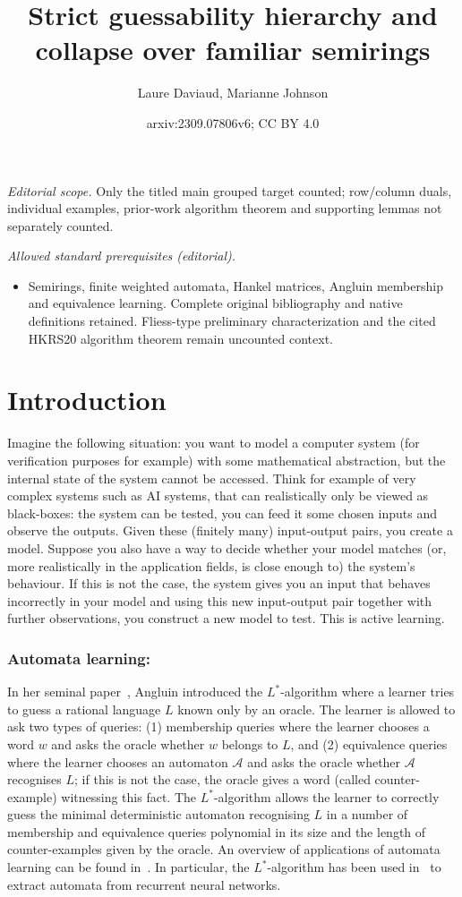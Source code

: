 \documentclass[10pt,a4paper]{amsart}
\title{Strict guessability hierarchy and collapse over familiar semirings}
\author{Laure Daviaud, Marianne Johnson}
\date{arxiv:2309.07806v6; CC BY 4.0}
\theoremstyle{definition}
\numberwithin{equation}{section}
\numberwithin{theorem}{section}
\begin{document}
\maketitle
\noindent\textit{Editorial scope.} Only the titled main grouped target counted; row/column duals, individual examples, prior-work algorithm theorem and supporting lemmas not separately counted.\par\medskip
\noindent\textit{Allowed standard prerequisites (editorial).}\begin{itemize}
\item Semirings, finite weighted automata, Hankel matrices, Angluin membership and equivalence learning. Complete original bibliography and native definitions retained. Fliess-type preliminary characterization and the cited HKRS20 algorithm theorem remain uncounted context.
\end{itemize}\medskip
\section{Introduction}\label{section:intro}
Imagine the following situation: you want to model a computer system (for verification purposes for example) with some mathematical abstraction, but the internal state of the system cannot be accessed. Think for example of very complex systems such as AI systems, that can realistically only be viewed as black-boxes: the system can be tested, you can feed it some chosen inputs and observe the outputs. Given these (finitely many)  input-output pairs, you create a model. Suppose you also have a way to decide whether your model matches (or, more realistically in the application fields, is close enough to) the system's behaviour. If this is not the case, the system gives you an input that behaves incorrectly in your model and using this new input-output pair together with further observations, you construct a new model to test. This is active learning.   

\subsubsection*{\textbf{Automata learning:}} In her seminal paper~\cite{A87}, Angluin introduced the $L^*$-algorithm where a learner tries to guess a rational language $L$ known only by an oracle. The learner is allowed to ask two types of queries: (1) membership queries where the learner chooses a word $w$ and asks the oracle whether $w$ belongs to $L$, and (2) equivalence queries where the learner chooses an automaton $\mathcal{A}$ and asks the oracle whether $\mathcal{A}$ recognises $L$; if this is not the case, the oracle gives a word (called counter-example) witnessing this fact. The $L^*$-algorithm allows the learner to correctly guess  the minimal deterministic automaton recognising $L$ in a  number of membership and equivalence queries polynomial in its size and the length of counter-examples given by the oracle. An overview of applications of automata learning can be found in~\cite{L06,HS16,V17}. In particular, the $L^*$-algorithm has been used in~\cite{WGY18} to extract automata from recurrent neural networks.
\end{document}
